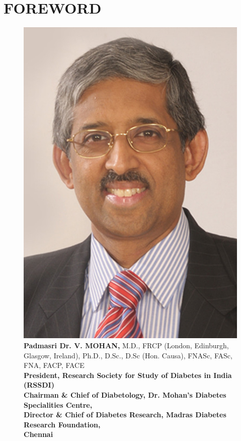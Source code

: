 
\chapter*{FOREWORD}

\begin{figure}
\includegraphics{images/001.jpg}
\caption{\textbf{Padmasri Dr. V. MOHAN,} {\small M.D., FRCP (London, Edinburgh,\\ Glasgow, Ireland), Ph.D., D.Sc., D.Sc (Hon. Causa), FNASc, FASc,\\ FNA, FACP, FACE\\\textbf{President, Research Society for Study of Diabetes in India\\ (RSSDI)\\ Chairman \& Chief of Diabetology, Dr. Mohan’s Diabetes\\ Specialities Centre,\\ Director \& Chief of Diabetes Research, Madras Diabetes\\ Research Foundation,\\ Chennai}}}
\end{figure}

